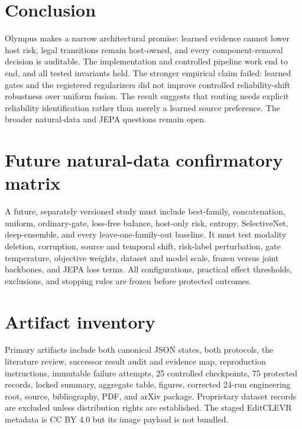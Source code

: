 \documentclass[10pt]{article}
\begin{document}
\section{Conclusion}
Olympus makes a narrow architectural promise: learned evidence cannot lower host risk,
legal transitions remain host-owned, and every component-removal decision is auditable.
The implementation and controlled pipeline work end to end, and all tested invariants
held. The stronger empirical claim failed: learned gates and the registered regularizers
did not improve controlled reliability-shift robustness over uniform fusion. The result
suggests that routing needs explicit reliability identification rather than merely a
learned source preference. The broader natural-data and JEPA questions remain open.

\appendix
\section{Future natural-data confirmatory matrix}
A future, separately versioned study must include best-family, concatenation, uniform, ordinary-gate,
loss-free balance, host-only risk, entropy, SelectiveNet, deep-ensemble, and every
leave-one-family-out baseline. It must test modality deletion, corruption, source and
temporal shift, risk-label perturbation, gate temperature, objective weights, dataset and
model scale, frozen versus joint backbones, and JEPA loss terms. All configurations,
practical effect thresholds, exclusions, and stopping rules are frozen before protected
outcomes.

\section{Artifact inventory}
Primary artifacts include both canonical JSON states, both protocols, the literature
review, successor result audit and evidence map, reproduction instructions, immutable
failure attempts, 25 controlled checkpoints, 75 protected records, locked summary,
aggregate table, figures, corrected 24-run engineering root, source, bibliography, PDF,
and arXiv package. Proprietary dataset records are excluded unless distribution rights
are established. The staged EditCLEVR metadata is CC BY 4.0 but its image payload is not
bundled.



\end{document}
